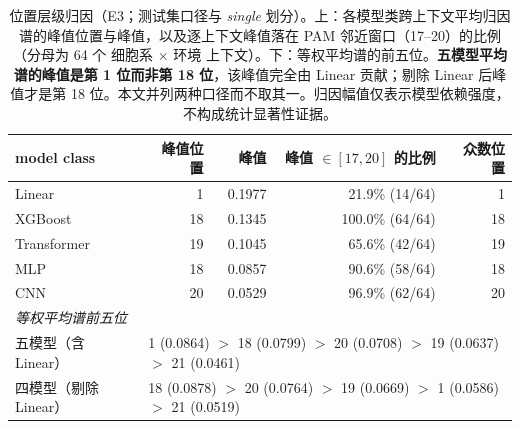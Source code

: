 \begin{table}[htbp]
\centering
\footnotesize
\caption{位置层级归因（E3；测试集口径与 \emph{single} 划分）。上：各模型类跨上下文平均归因谱的峰值位置与峰值，以及逐上下文峰值落在 PAM 邻近窗口（17--20）的比例（分母为 64 个 细胞系 $\times$ 环境 上下文）。下：等权平均谱的前五位。\textbf{五模型平均谱的峰值是第 1 位而非第 18 位}，该峰值完全由 Linear 贡献；剔除 Linear 后峰值才是第 18 位。本文并列两种口径而不取其一。归因幅值仅表示模型依赖强度，不构成统计显著性证据。}
\label{tab:attribution-position}
\begin{tabular}{lrrrr}
\toprule
model class & 峰值位置 & 峰值 & 峰值 $\in[17,20]$ 的比例 & 众数位置 \\
\midrule
Linear & 1 & 0.1977 & 21.9\% (14/64) & 1 \\
XGBoost & 18 & 0.1345 & 100.0\% (64/64) & 18 \\
Transformer & 19 & 0.1045 & 65.6\% (42/64) & 19 \\
MLP & 18 & 0.0857 & 90.6\% (58/64) & 18 \\
CNN & 20 & 0.0529 & 96.9\% (62/64) & 20 \\
\midrule
\multicolumn{5}{l}{\textit{等权平均谱前五位}} \\
五模型（含 Linear） & \multicolumn{4}{l}{1 (0.0864) $>$ 18 (0.0799) $>$ 20 (0.0708) $>$ 19 (0.0637) $>$ 21 (0.0461)} \\
\midrule
四模型（剔除 Linear） & \multicolumn{4}{l}{18 (0.0878) $>$ 20 (0.0764) $>$ 19 (0.0669) $>$ 1 (0.0586) $>$ 21 (0.0519)} \\
\bottomrule
\end{tabular}
\end{table}
